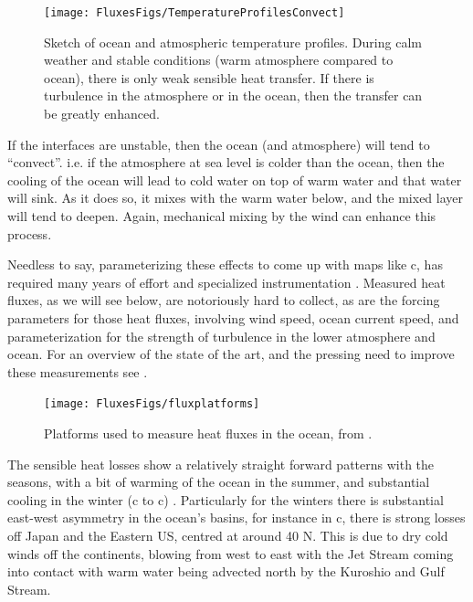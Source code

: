 \begin{figure}[htb]
\texttt{[image: FluxesFigs/TemperatureProfilesConvect]}
 \caption{Sketch of ocean and atmospheric temperature profiles.  During calm weather and stable conditions (warm atmosphere compared to ocean), there is only weak sensible heat transfer.  If there is turbulence in the atmosphere or in the ocean, then the transfer can be greatly enhanced.}
  \label{fig:TemperatureProfilesConvect}
\end{figure}

If the interfaces are unstable, then the ocean (and atmosphere) will tend to ``convect''.  i.e. if the atmosphere at sea level is colder than the ocean, then the cooling of the ocean will lead to cold water on top of warm water and that water will sink.  As it does so, it mixes with the warm water below, and the mixed layer will tend to deepen. Again, mechanical mixing by the wind can enhance this process.

Needless to say, parameterizing these effects to come up with maps like c, has required many years of effort and specialized instrumentation .  Measured heat fluxes, as we will see below, are notoriously hard to collect, as are the forcing parameters for those heat fluxes, involving wind speed, ocean current speed, and parameterization for the strength of turbulence in the lower atmosphere and ocean.  For an overview of the state of the art, and the pressing need to improve these measurements see \citet{croninetal19}.  

\begin{figure}[htb]
\texttt{[image: FluxesFigs/fluxplatforms]}
 \caption{Platforms used to measure heat fluxes in the ocean, from \citet{croninetal19}.}
  \label{fig:fluxplatforms}
\end{figure}

The sensible heat losses show a relatively straight forward patterns with the seasons, with a bit of warming of the ocean in the summer, and substantial cooling in the winter (c to c) .  Particularly for the winters there is substantial east-west asymmetry in the ocean's basins, for instance in c, there is strong losses off Japan and the Eastern US, centred at around 40 N.  This is due to dry cold winds off the continents, blowing from west to east with the Jet Stream coming into contact with warm water being advected north by the Kuroshio and Gulf Stream.  

